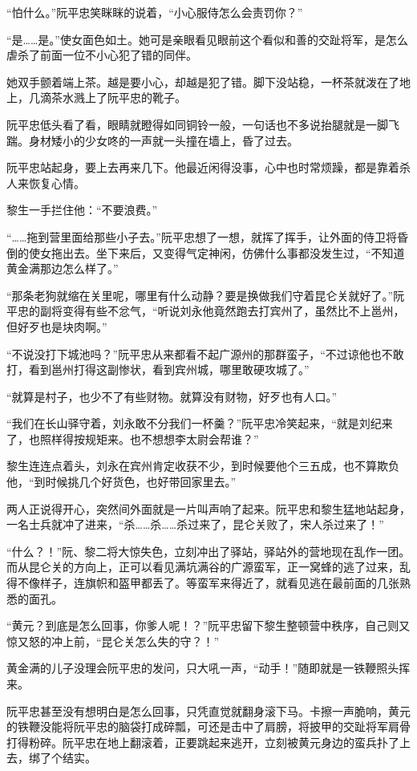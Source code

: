 “怕什么。”阮平忠笑眯眯的说着，“小心服侍怎么会责罚你？”

“是……是。”使女面色如土。她可是亲眼看见眼前这个看似和善的交趾将军，是怎么虐杀了前面一位不小心犯了错的同伴。

她双手颤着端上茶。越是要小心，却越是犯了错。脚下没站稳，一杯茶就泼在了地上，几滴茶水溅上了阮平忠的靴子。

阮平忠低头看了看，眼睛就瞪得如同铜铃一般，一句话也不多说抬腿就是一脚飞踹。身材矮小的少女咚的一声就一头撞在墙上，昏了过去。

阮平忠站起身，要上去再来几下。他最近闲得没事，心中也时常烦躁，都是靠着杀人来恢复心情。

黎生一手拦住他：“不要浪费。”

“……拖到营里面给那些小子去。”阮平忠想了一想，就挥了挥手，让外面的侍卫将昏倒的使女拖出去。坐下来后，又变得气定神闲，仿佛什么事都没发生过，“不知道黄金满那边怎么样了。”

“那条老狗就缩在关里呢，哪里有什么动静？要是换做我们守着昆仑关就好了。”阮平忠的副将变得有些不忿气，“听说刘永他竟然跑去打宾州了，虽然比不上邕州，但好歹也是块肉啊。”

“不说没打下城池吗？”阮平忠从来都看不起广源州的那群蛮子，“不过谅他也不敢打，看到邕州打得这副惨状，看到宾州城，哪里敢硬攻城了。”

“就算是村子，也少不了有些财物。就算没有财物，好歹也有人口。”

“我们在长山驿守着，刘永敢不分我们一杯羹？”阮平忠冷笑起来，“就是刘纪来了，也照样得按规矩来。也不想想李太尉会帮谁？”

黎生连连点着头，刘永在宾州肯定收获不少，到时候要他个三五成，也不算欺负他，“到时候挑几个好货色，也好带回家里去。”

两人正说得开心，突然间外面就是一片叫声响了起来。阮平忠和黎生猛地站起身，一名士兵就冲了进来，“杀……杀……杀过来了，昆仑关败了，宋人杀过来了！”

“什么？！”阮、黎二将大惊失色，立刻冲出了驿站，驿站外的营地现在乱作一团。而从昆仑关的方向上，正可以看见满坑满谷的广源蛮军，正一窝蜂的逃了过来，乱得不像样子，连旗帜和盔甲都丢了。等蛮军来得近了，就看见逃在最前面的几张熟悉的面孔。

“黄元？到底是怎么回事，你爹人呢！？”阮平忠留下黎生整顿营中秩序，自己则又惊又怒的冲上前，“昆仑关怎么失的守？！”

黄金满的儿子没理会阮平忠的发问，只大吼一声，“动手！”随即就是一铁鞭照头挥来。

阮平忠甚至没有想明白是怎么回事，只凭直觉就翻身滚下马。卡擦一声脆响，黄元的铁鞭没能将阮平忠的脑袋打成碎瓢，可还是击中了肩膀，将披甲的交趾将军肩骨打得粉碎。阮平忠在地上翻滚着，正要跳起来逃开，立刻被黄元身边的蛮兵扑了上去，绑了个结实。

